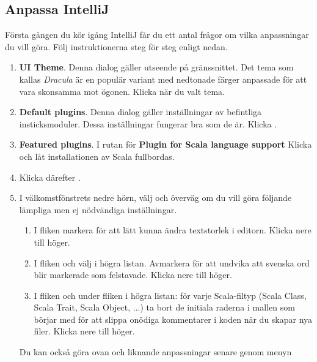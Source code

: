 \subsection{Anpassa IntelliJ}\label{appendix:ide:intellij:tweak}
Första gången du kör igång IntelliJ får du ett antal frågor om vilka anpassningar du vill göra. Följ instruktionerna steg för steg enligt nedan.
\begin{enumerate}
\item \textbf{UI Theme}. Denna dialog gäller utseende på gränssnittet. Det tema som kallas \textit{Dracula} är en populär variant med nedtonade färger anpassade för att vara skonsamma mot ögonen. Klicka  när du valt tema.

\item \textbf{Default plugins}. Denna dialog gäller inställningar av befintliga insticksmoduler. Dessa inställningar fungerar bra som de är. Klicka .

\item \textbf{Featured plugins}. I rutan för \textbf{Plugin for Scala language support} Klicka  och låt installationen av Scala fullbordas. 

\item Klicka därefter .

\item I välkomstfönstrets nedre hörn, välj  och överväg om du vill göra följande lämpliga men ej nödvändiga inställningar. 
\begin{enumerate}
\item I fliken  markera  för att lätt kunna ändra textstorlek i editorn. Klicka  nere till höger.

\item I fliken  och välj  i högra listan. Avmarkera  för att undvika att svenska ord blir markerade som felstavade. Klicka  nere till höger.

\item I fliken  och under fliken  i högra listan: för varje Scala-filtyp (Scala Class, Scala Trait, Scala Object, ...) ta bort de initiala raderna i mallen som börjar med \code{#} för att slippa onödiga kommentarer i koden när du skapar nya filer. Klicka  nere till höger.
 
\end{enumerate} 
Du kan också göra ovan och liknande anpassningar senare genom menyn 
\end{enumerate} 

